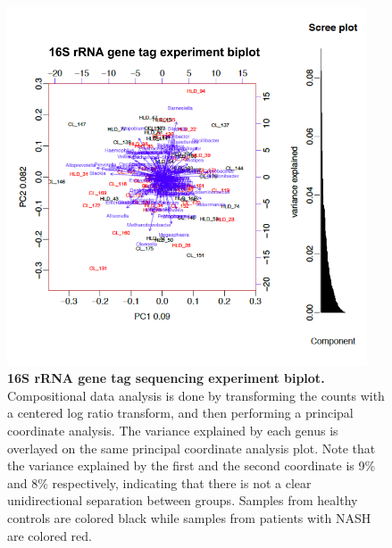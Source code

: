 \begin{figure}[h]
\begin{center}
\includegraphics[width=0.95\textwidth]{16s_biplot.png}
\caption{\textbf{16S rRNA gene tag sequencing experiment biplot.} Compositional data analysis is done by transforming the counts with a centered log ratio transform, and then performing a principal coordinate analysis. The variance explained by each genus is overlayed on the same principal coordinate analysis plot. Note that the variance explained by the first and the second coordinate is 9\% and 8\% respectively, indicating that there is not a clear unidirectional separation between groups. Samples from healthy controls are colored black while samples from patients with NASH are colored red. }
\end{center}
\label{nafld_16s_biplot}
\end{figure}

